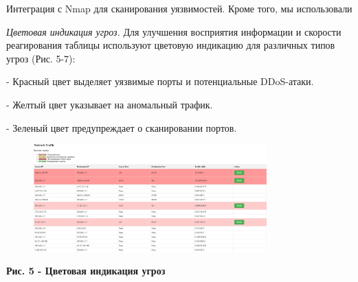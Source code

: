 Интеграция с Nmap для сканирования уязвимостей. Кроме того, мы
использовали

\emph{Цветовая индикация угроз.} Для улучшения восприятия информации и
скорости реагирования таблицы используют цветовую индикацию для
различных типов угроз (Рис. 5-7):

- Красный цвет выделяет уязвимые порты и потенциальные DDoS-атаки.

- Желтый цвет указывает на аномальный трафик.

- Зеленый цвет предупреждает о сканировании портов.

\begin{figure}[H]
	\centering
	\includegraphics[width=0.8\textwidth]{assets/51}
	\caption*{}
\end{figure}

\textbf{Рис. 5 - Цветовая индикация угроз}

